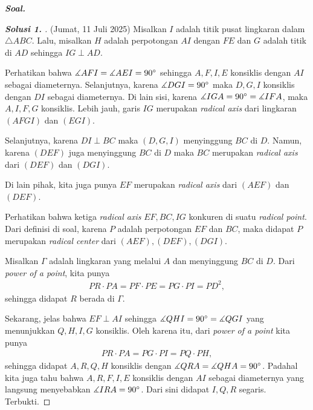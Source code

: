 \textbf{\textit{Soal.}} 

\begin{proof}[\textbf{Solusi 1. }] (Jumat, 11 Juli 2025) 
    Misalkan $I$ adalah titik pusat lingkaran dalam $\triangle ABC$. Lalu, misalkan $H$ adalah perpotongan $AI$ dengan $FE$ dan $G$ adalah titik di $AD$ sehingga $IG \perp AD$.
    
    Perhatikan bahwa $\measuredangle AFI = \measuredangle AEI = 90^\circ$ sehingga $A,F,I,E$ konsiklis dengan $AI$ sebagai diameternya. 
    Selanjutnya, karena $\measuredangle DGI = 90^\circ$ maka $D,G,I$ konsiklis dengan $DI$ sebagai diameternya. Di lain sisi, karena $\measuredangle IGA = 90^\circ = \measuredangle IFA$, maka $A,I,F,G$ konsiklis. 
    Lebih jauh, garis $IG$ merupakan \textit{radical axis} dari lingkaran $(AFGI)$ dan $(EGI)$.
    
    Selanjutnya, karena $DI \perp BC$ maka $(D,G,I)$ menyinggung $BC$ di $D$. Namun, karena $(DEF)$ juga menyinggung $BC$ di $D$ maka $BC$ merupakan \textit{radical axis} dari $(DEF)$ dan $(DGI)$.

    Di lain pihak, kita juga punya $EF$ merupakan \textit{radical axis} dari $(AEF)$ dan $(DEF)$.

    Perhatikan bahwa ketiga \textit{radical axis} $EF, BC, IG$ konkuren di suatu \textit{radical point}. Dari definisi di soal, karena $P$ adalah perpotongan $EF$ dan $BC$, maka didapat $P$ merupakan \textit{radical center} dari $(AEF), (DEF), (DGI)$.

    Misalkan $\Gamma$ adalah lingkaran yang melalui $A$ dan menyinggung $BC$ di $D$. Dari \textit{power of a point}, kita punya
    \begin{align*}
        PR \cdot PA = PF \cdot PE = PG \cdot PI = PD^2,
    \end{align*}
    sehingga didapat $R$ berada di $\Gamma$.

    Sekarang, jelas bahwa $EF \perp AI$ sehingga $\measuredangle QHI = 90^\circ = \measuredangle QGI$ yang menunjukkan $Q,H,I,G$ konsiklis. Oleh karena itu, dari \textit{power of a point} kita punya
    \begin{align*}
        PR \cdot PA = PG \cdot PI = PQ \cdot PH,
    \end{align*}
    sehingga didapat $A,R,Q,H$ konsiklis dengan $\measuredangle QRA = \measuredangle QHA = 90^\circ$. 
    Padahal kita juga tahu bahwa $A,R,F,I,E$ konsiklis dengan $AI$ sebagai diameternya yang langsung menyebabkan $\measuredangle IRA = 90^\circ$. Dari sini didapat $I,Q,R$ segaris. Terbukti.
\end{proof}

